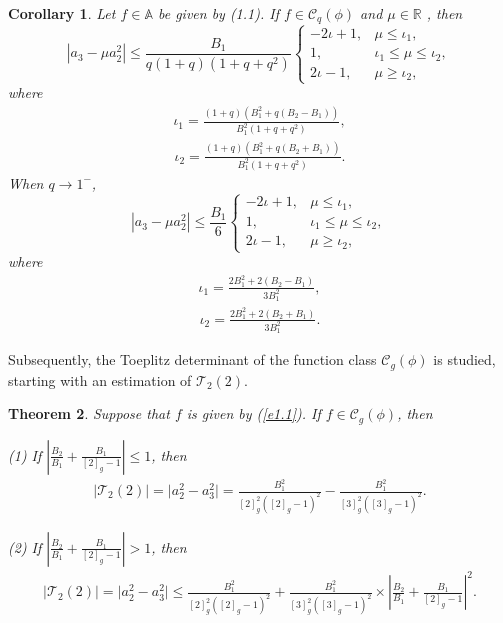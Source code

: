 \documentclass[11pt,twoside, reqno]{article}
\newtheorem{theorem}{Theorem}[section]
\newtheorem{corollary}[theorem]{Corollary}
\theoremstyle{definition}
\begin{document}
\begin{corollary}
Let $f\in \mathbb{A} $ be given by (1.1). If $f\in\mathcal{C}_{q}(\phi)$ and $\mu \in \mathbb{R}$ , then
\begin{equation*}
\left|a_{3} - \mu a_{2}^{2}\right| \leq \frac{B_{1}}{q(1+q)(1+q+q^{2})}
\begin{cases}
-2\iota + 1, & \mu \leq \iota_{1}, \\
1, &  \iota_{1} \leq \mu \leq \iota_{2}, \\
2\iota - 1, &  \mu \geq \iota_{2},
\end{cases}
\end{equation*}
where
\begin{align}\nonumber
\iota_{1}=\frac{(1+q)(B_{1}^{2}+q(B_{2}-B_{1}))}{B_{1}^{2}(1+q+q^{2})},
\end{align}
\begin{align}\nonumber
\iota_{2}=\frac{(1+q)(B_{1}^{2}+q(B_{2}+B_{1}))}{B_{1}^{2}(1+q+q^{2})}.
\end{align}
When $q\rightarrow1^{-}$,
\begin{equation*}
\left|a_{3} - \mu a_{2}^{2}\right| \leq \frac{B_{1}}{6}
\begin{cases}
-2\iota + 1, & \mu \leq \iota_{1}, \\
1, &  \iota_{1} \leq \mu \leq \iota_{2}, \\
2\iota - 1, &  \mu \geq \iota_{2},
\end{cases}
\end{equation*}
where
\begin{align}\nonumber
\iota_{1}=\frac{2B_{1}^{2}+2(B_{2}-B_{1})}{3B_{1}^{2}},
\end{align}
\begin{align}\nonumber
\iota_{2}=\frac{2B_{1}^{2}+2(B_{2}+B_{1})}{3B_{1}^{2}}.
\end{align}
\end{corollary}
Subsequently, the Toeplitz determinant of the function class $\mathcal{C}_{g}(\phi)$ is studied, starting with an estimation of $\mathcal{T}_2(2)$.
\begin{theorem}
Suppose that $f$ is given by (\ref{e1.1}). If $f\in\mathcal{C}_{g}(\phi)$, then

(1) If $|\frac{B_{2}}{B_{1}}+\frac{B_{1}}{[2]_{g}-1}|\leq1$, then
\begin{align}\nonumber
\mid \mathcal{T}_2(2)\mid=\mid a_{2}^2-a_{3}^{2}\mid=
\frac{B_{1}^{2}}{[2]_{g}^{2}([2]_{g}-1)^{2}}-\frac{B_{1}^{2}}{[3]_{g}^{2}([3]_{g}-1)^{2}}.
\end{align}

(2) If $|\frac{B_{2}}{B_{1}}+\frac{B_{1}}{[2]_{g}-1}|>1$, then
\begin{align}\nonumber
\mid \mathcal{T}_2(2)\mid=\mid a_{2}^2-a_{3}^{2}\mid\leq
\frac{B_{1}^{2}}{[2]_{g}^{2}([2]_{g}-1)^{2}}+\frac{B_{1}^{2}}{[3]_{g}^{2}([3]_{g}-1)^{2}}
\times\left|\frac{B_{2}}{B_{1}}+\frac{B_{1}}{[2]_{g}-1}\right|^{2}.
\end{align}
\end{theorem}
\end{document}
